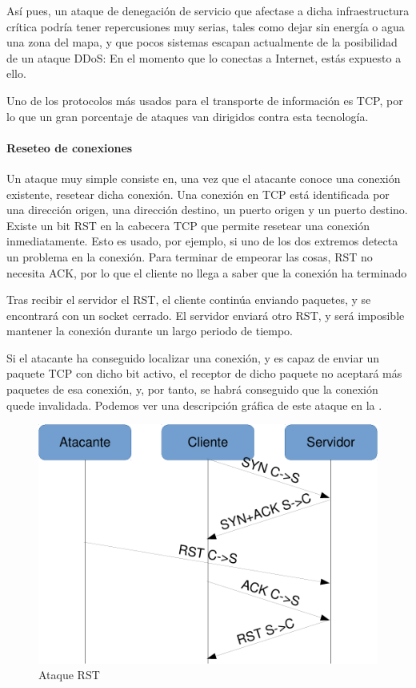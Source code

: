 Así pues, un ataque de denegación de servicio que afectase a dicha infraestructura crítica podría tener repercusiones 
muy serias, tales como dejar sin energía o agua una zona del mapa, y que pocos sistemas escapan actualmente de la 
posibilidad de un ataque DDoS: En el momento que lo conectas a Internet, estás expuesto a ello.

Uno de los protocolos más usados para el transporte de información es \gls{TCP}, por lo que un gran porcentaje de 
ataques van dirigidos contra esta tecnología.

\paragraph{Reseteo de conexiones}\mbox{\newline}

Un ataque muy simple consiste en, una vez que el atacante conoce una conexión existente, resetear dicha conexión. Una 
conexión en \gls{TCP} está identificada por una dirección origen, una dirección destino, un puerto origen y un puerto 
destino. Existe un bit RST en la cabecera \gls{TCP} que permite resetear una conexión inmediatamente. 
Esto es usado, por ejemplo, si uno de los dos extremos detecta un problema en la conexión. Para terminar de empeorar 
las cosas, RST no necesita \gls{ACK}, por lo que el cliente no llega a saber que la conexión ha terminado

Tras recibir el servidor el RST, el cliente continúa enviando paquetes, y se encontrará con un socket cerrado. El 
servidor enviará otro RST, y será imposible mantener la conexión durante un largo periodo de tiempo. 

Si el atacante ha conseguido localizar una conexión, y es capaz de enviar un paquete \gls{TCP} con dicho bit activo, el 
receptor de dicho paquete no aceptará más paquetes de esa conexión, y, por tanto, se habrá conseguido que la conexión 
quede invalidada. Podemos ver una descripción gráfica de este ataque en la .

\begin{figure}[htbp]
\centering
\includegraphics[width=.8\textwidth]{CapituloDDoS/Figuras/RST_attack}
\caption{Ataque RST}
\end{figure}
%

